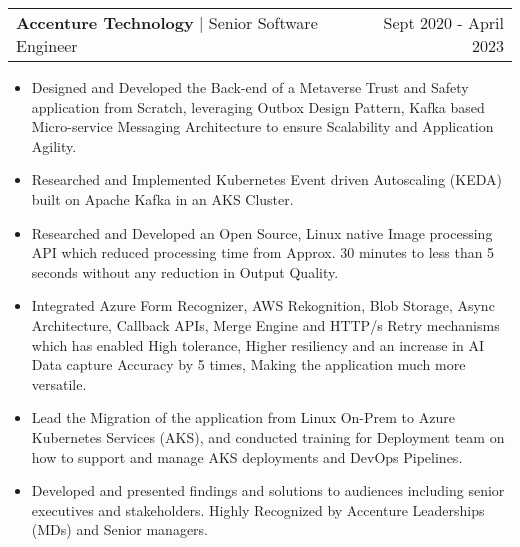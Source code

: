 \documentclass[a4paper,12pt]{article}
\makeatletter
\newenvironment{joblong}[3]
    {
    \begin{tabularx}{\linewidth}{@{}l X r@{}}
    \textbf{#1} | #2 & \hfill &  #3 \\[3.75pt]
    \end{tabularx}
    \begin{minipage}[t]{\linewidth}
    \begin{itemize}[nosep,after=\strut, leftmargin=1em, itemsep=3pt,label=-]
    }
    {
    \end{itemize}
    \end{minipage}    
    }
\makeatother
\begin{document}
\begin{joblong}{Accenture Technology}{Senior Software Engineer}{Sept 2020 - April 2023}

\item Designed and Developed the Back-end of a Metaverse Trust and Safety application from Scratch, leveraging Outbox Design Pattern, Kafka based Micro-service Messaging Architecture to ensure Scalability and Application Agility.
\item Researched and Implemented Kubernetes Event driven Autoscaling (KEDA) built on Apache Kafka in an AKS Cluster.
\item Researched and Developed an Open Source, Linux native Image processing API which reduced processing time from Approx. 30 minutes to less than 5 seconds without any reduction in Output Quality.
\item Integrated Azure Form Recognizer, AWS Rekognition, Blob Storage, Async Architecture, Callback APIs, Merge Engine and HTTP/s Retry mechanisms which has enabled High tolerance, Higher resiliency and an increase in AI Data capture Accuracy by 5 times, Making the application much more versatile.
\item Lead the Migration of the application from Linux On-Prem to Azure Kubernetes Services (AKS), and conducted training for Deployment team on how to support and manage AKS deployments and DevOps Pipelines.
\item Developed and presented findings and solutions to audiences including senior executives and stakeholders. Highly Recognized by Accenture Leaderships (MDs) and Senior managers.

\end{joblong}



\end{document}
